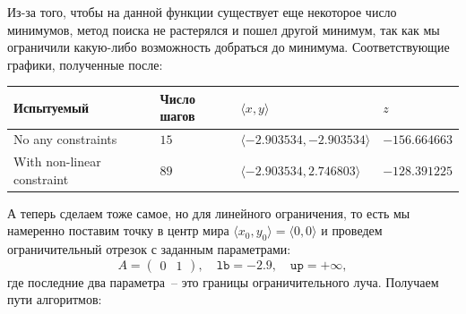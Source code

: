 \documentclass[12pt, a4paper, oneside, final]{article}
\begin{document}
	Из-за того, чтобы на данной функции существует еще некоторое число минимумов, метод поиска не растерялся и пошел другой минимум, так как мы ограничили какую-либо возможность добраться до минимума.
	Соответствующие графики, полученные после:
	\begin{table}[H]
		\centering
		\begin{tabular}{l|l|l|l}
			Испытуемый & Число шагов & $\langle x, y \rangle$ & $z$ \\ \hline
			No any constraints & $15$ & $\langle -2.903534,  -2.903534 \rangle$ & $-156.664663$ \\
			With non-linear constraint & $89$ & $\langle -2.903534,   2.746803 \rangle$ & $-128.391225$
		\end{tabular}
	\end{table}
	А теперь сделаем тоже самое, но для линейного ограничения, то есть мы намеренно поставим точку в центр мира $\langle x_0, y_0 \rangle = \langle 0, 0 \rangle$ и проведем ограничительный отрезок с заданным параметрами:
	\[
		A =
		\begin{pmatrix}
			0 & 1
		\end{pmatrix}, \quad \mathtt{lb} = -2.9, \quad \mathtt{up} = +\infty,
	\] где последние два параметра~-- это границы ограничительного луча.
	Получаем пути алгоритмов:
\end{document}
